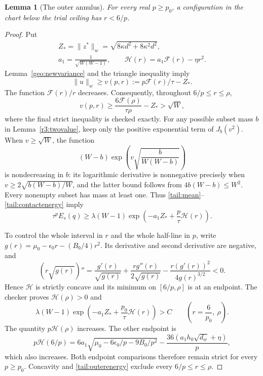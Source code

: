 \documentclass[12pt,reqno]{amsart}
\newtheorem{lemma}[theorem]{Lemma}
\theoremstyle{definition}
\numberwithin{equation}{section}
\begin{document}
\begin{lemma}[The outer annulus]\label{tail:outer}
For every real $p\ge p_0$, a configuration in the chart below the
trial ceiling has $r<6/p$.
\end{lemma}
\begin{proof}
Put
\[
 \begin{gathered}
 Z_* =\|z^*\|_w=\sqrt{8\kappa d^2+8\kappa^2d^2},\\
 a_1=\frac1{\sqrt{W(W-1)}},\qquad
 \mathcal H(r)=a_1\mathcal F(r)-\eta r^2.
 \end{gathered}
\]
Lemma~\ref{geo:newvariance} and the triangle inequality imply
\[
 \|u\|_w\ge v(p,r):=p\mathcal F(r)/\tau-Z_*.
\]
The function $\mathcal F(r)/r$ decreases. Consequently, throughout
$6/p\le r\le\rho$,
\[
 v(p,r)\ge\frac{6\mathcal F(\rho)}{\tau\rho}-Z_*>\sqrt W,
\]
where the final strict inequality is checked exactly.
For any possible subset mass $b$ in Lemma~\ref{r3:twovalue}, keep
only the positive exponential term of $J_b(v^2)$. When $v\ge\sqrt W$,
the function
\[
 (W-b)\exp\left(v\sqrt{\frac b{W(W-b)}}\right)
\]
is nondecreasing in $b$: its logarithmic derivative is nonnegative
precisely when $v\ge2\sqrt{b(W-b)/W}$, and the latter bound follows
from $4b(W-b)\le W^2$. Every nonempty subset has mass at least one.
Thus \eqref{tail:mean}--\eqref{tail:contactenergy} imply
\begin{equation}\label{tail:outerenergy}
 \tau^pE_s(q)\ge\lambda(W-1)
            \exp\left(-a_1Z_*+\frac p\tau\mathcal H(r)\right).
\end{equation}

To control the whole interval in $r$ and the whole half-line in $p$,
write $g(r)=\mu_0-\epsilon_0r-(B_0/4)r^2$. Its derivative and second
derivative are negative, and
\[
 (r\sqrt{g(r)})''=
 \frac{g'(r)}{\sqrt{g(r)}}+
 \frac{r g''(r)}{2\sqrt{g(r)}}-
 \frac{r(g'(r))^2}{4g(r)^{3/2}}<0.
\]
Hence $\mathcal H$ is strictly concave and its minimum on
$[6/p,\rho]$ is at an endpoint. The checker proves
$\mathcal H(\rho)>0$ and
\[
 \lambda(W-1)\exp\left(-a_1Z_*+
        \frac{p_0}{\tau}\mathcal H(r)\right)>C
 \qquad\left(r=\frac6{p_0},\ \rho\right).
\]
The quantity $p\mathcal H(\rho)$ increases. The other endpoint is
\[
 p\mathcal H(6/p)=
 6a_1\sqrt{\mu_0-6\epsilon_0/p-9B_0/p^2}
       -\frac{36(a_1h_0\sqrt{d_w}+\eta)}p,
\]
which also increases. Both endpoint comparisons therefore remain
strict for every $p\ge p_0$. Concavity and
\eqref{tail:outerenergy} exclude every $6/p\le r\le\rho$.
\end{proof}
\end{document}
